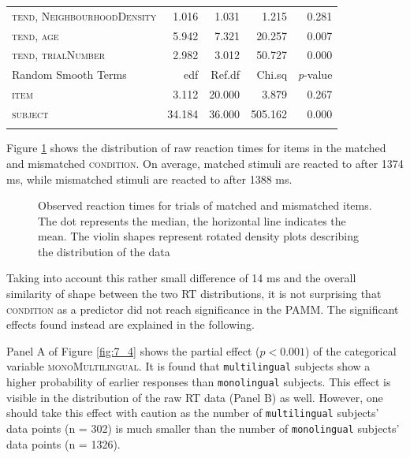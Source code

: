 \begin{table}
\begin{tabular}{lrrrr}
\textsc{tend,
  NeighbourhoodDensity} & 1.016    & 1.031  & 1.215    & 0.281             \\
\textsc{tend,
  age}                  & 5.942    & 7.321  & 20.257   & 0.007             \\
\textsc{tend,
  trialNumber}          & 2.982    & 3.012  & 50.727   & 0.000             \\ 
\midrule
Random Smooth Terms          & edf      & Ref.df & Chi.sq   & \textit{p}-value  \\ 
\midrule
\textsc{item}                         & 3.112    & 20.000 & 3.879    & 0.267             \\
\textsc{subject}                      & 34.184   & 36.000 & 505.162  & 0.000             \\
\lspbottomrule
\end{tabular}
\end{table}

Figure \ref{fig:7_3} shows the distribution of raw reaction times for items in the matched and mismatched \textsc{condition}. On average, matched stimuli are reacted to after 1374 ms, while mismatched stimuli are reacted to after 1388 ms. 

\begin{figure}
    \centering
    
    \caption{Observed reaction times for trials of matched and mismatched items. The dot represents the median, the horizontal line indicates the mean. The violin shapes represent rotated density plots describing the distribution of the data}
    \label{fig:7_3}
\end{figure}

Taking into account this rather small difference of 14 ms and the overall similarity of shape between the two RT distributions, it is not surprising that \textsc{condition} as a predictor did not reach significance in the PAMM. The significant effects found instead are explained in the following.

Panel A of Figure \ref{fig:7_4} shows the partial effect ($p<0.001$) of the categorical variable \textsc{monoMultilingual}. It is found that \texttt{multilingual} subjects show a higher probability of earlier responses than \texttt{monolingual} subjects. This effect is visible in the distribution of the raw RT data (Panel B) as well. However, one should take this effect with caution as the number of \texttt{multilingual} subjects’ data points (n = 302) is much smaller than the number of \texttt{monolingual} subjects’ data points (n = 1326). 

